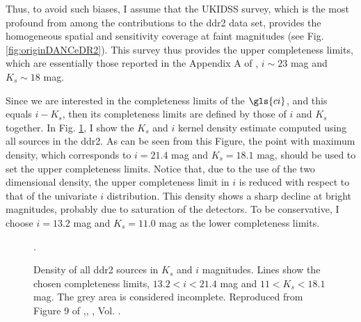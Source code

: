 Thus, to avoid such biases, I assume that the UKIDSS survey, which is the most profound from among the contributions to the \gls{ddr2} data set, provides the homogeneous spatial and sensitivity coverage at faint magnitudes (see Fig. \ref{fig:originDANCeDR2}). This survey thus provides the upper completeness limits, which are essentially those reported in the Appendix A of \citet{Bouy2015}, $i\sim23$ mag and $K_s\sim18$ mag.

Since we are interested in the completeness limits of the $\gls{ci}$, and this equals $i -K_s$, then its completeness limits are defined by those of $i$ and $K_s$ together. In Fig. \ref{fig:completeness}, I show the $K_s$ and $i$ kernel density estimate computed using all sources in the \gls{ddr2}. As can be seen from this Figure, the point with maximum density, which corresponds to $i=21.4$ mag and $K_s=18.1$ mag, should be used to set the upper completeness limits. Notice that, due to the use of the two dimensional density, the upper completeness limit in $i$ is reduced with respect to that of the univariate $i$ distribution. This density shows a sharp decline at bright magnitudes, probably due to saturation of the detectors. To be conservative, I choose $i=13.2$ mag and $K_s=11.0$ mag as the lower completeness limits.

\begin{figure}[htbp]
\begin{center}
\caption{Density of all \gls{ddr2} sources in $K_s$ and $i$ magnitudes. Lines show the chosen completeness limits, $13.2<i<21.4$ mag and $11<K_s<18.1$ mag. The grey area is considered incomplete. Reproduced from Figure 9 of \citet{Olivares2017},\textit{}, , Vol. .}
\label{fig:completeness}.
\end{center}
\end{figure}

